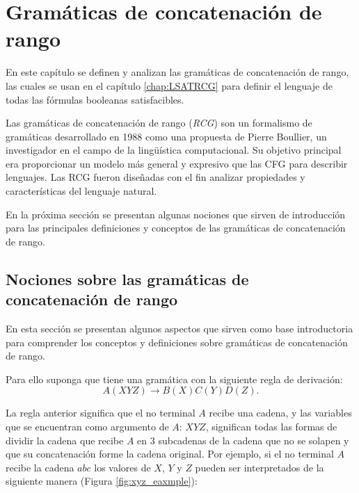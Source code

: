 \chapter{Gramáticas de concatenación de rango}
\label{chap:RCG}

En este capítulo se definen y analizan las gramáticas de concatenación de rango, las cuales se usan en el
capítulo \ref{chap:LSATRCG} para definir el lenguaje de todas las fórmulas booleanas satisfacibles.

Las gramáticas de concatenación de rango (\textit{RCG}) \cite{mainRCGBib} son un formalismo de gramáticas desarrollado
en 1988 como una propuesta de Pierre Boullier, un investigador en el campo de la lingüística computacional. Su
objetivo principal era proporcionar un modelo más general y expresivo que las CFG para describir lenguajes.
Las RCG fueron diseñadas con el fin analizar propiedades y características del lenguaje natural.

En la próxima sección se presentan algunas nociones que sirven de introducción para las principales definiciones y conceptos
de las gramáticas de concatenación de rango.

\section{Nociones sobre las gramáticas de concatenación de rango}

En esta sección se presentan algunos aspectos que sirven como base introductoria para comprender los conceptos y definiciones
sobre gramáticas de concatenación de rango.

Para ello suponga que tiene una gramática con la siguiente regla de derivación:
$$A(XYZ)\to B(X)C(Y)D(Z).$$

La regla anterior significa que el no terminal $A$ recibe una cadena, y las variables que se encuentran como argumento
de $A$: $XYZ$, significan todas las formas de dividir la cadena que recibe $A$ en 3 subcadenas de la cadena que no se solapen
y que su concatenación forme la cadena original. Por ejemplo, si el no terminal $A$ recibe la cadena $abc$ los valores de $X$, $Y$ y $Z$
pueden ser interpretados de la siguiente manera (Figura \ref{fig:xyz_eaxmple}):

